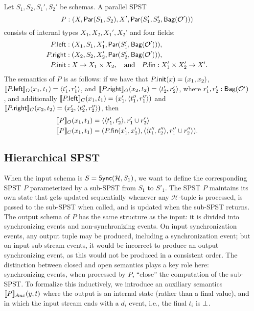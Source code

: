 \begin{definition}
Let $S_1, S_2, S_1', S_2'$ be schemas.
A parallel SPST
\[
P : (X, \parcomp{S_1}{S_2}, X', \parthree{S_1'}{S_2'}{\relleaf{\mathcal{O}'}})
\]
consists of internal types $X_1, X_2, X_1', X_2'$ and
four fields:
\begin{align*}
\spstfield{P}{left} &: (X_1, S_1, X_1', \parcomp{S_1'}{\relleaf{\mathcal{O}'}}), \\
\spstfield{P}{right} &: (X_2, S_2, X_2', \parcomp{S_2'}{\relleaf{\mathcal{O}'}}), \\
\spstfield{P}{init} &: X \to X_1 \times X_2,
\quad \text{and} \quad
\spstfield{P}{fin} : X_1' \times X_2' \to X'.
\end{align*}
The semantics of $P$ is as follows: if we have that
$\spstfield{P}{init}(x) = (x_1, x_2)$,
$\spstsemO{x_1}{t_1}{\spstfield{P}{left}} = \spspar{t_1'}{r_1'}$,
and
$\spstsemO{x_2}{t_2}{\spstfield{P}{right}} = \spspar{t_2'}{r_2'}$,
where $r_1', r_2': \relleaf{\mathcal{O}'}$,
and
additionally $\spstsemC{x_1}{t_1}{\spstfield{P}{left}} = (x_1', \spspar{t_1''}{r_1''})$
and
$\spstsemC{x_2}{t_2}{\spstfield{P}{right}} = (x_2', \spspar{t_2''}{r_2''})$,
then
\begin{align*}
\spstsemO{x_1}{t_1}{P}
    &= \spspar{\spspar{t_1'}{t_2'}}{r_1' \cup r_2'} \\
\spstsemC{x_1}{t_1}{P}
    &= ( \spstfield{P}{fin}(x_1', x_2'),
         \spspar{\spspar{t_1''}{t_2''}}{r_1'' \cup r_2''} ).
\end{align*}
\end{definition}

\subsection{Hierarchical SPST}

When the input schema is $S=\hier{\mathcal{H}}{S_1}$, we want to
define the corresponding SPST $P$ parameterized by a sub-SPST from
$S_1$ to $S'_1$.
The SPST $P$ maintains its own state that gets updated sequentially
whenever any $\mathcal{H}$-tuple is processed,
is passed to the sub-SPST when called, and is updated when the sub-SPST returns.
The output schema of $P$ has the same structure as the input:
it is divided into synchronizing events and non-synchronizing events.
On input synchronization events, any output tuple may be produced,
including a synchronization event; but on input sub-stream events, it would be incorrect
to produce an output synchronizing event, as this would not be produced in a consistent order.
The distinction between closed and open
semantics plays a key role here:
synchronizing events, when processed by $P$, ``close'' the computation of the sub-SPST.
To formalize this inductively,
we introduce an auxiliary semantics $\spstsemI{y}{t}{P}$
where the output is an internal state (rather than a final value),
and in which the input stream ends with a $d_i$ event,
i.e., the final $t_i$ is $\spsemp{}$.

